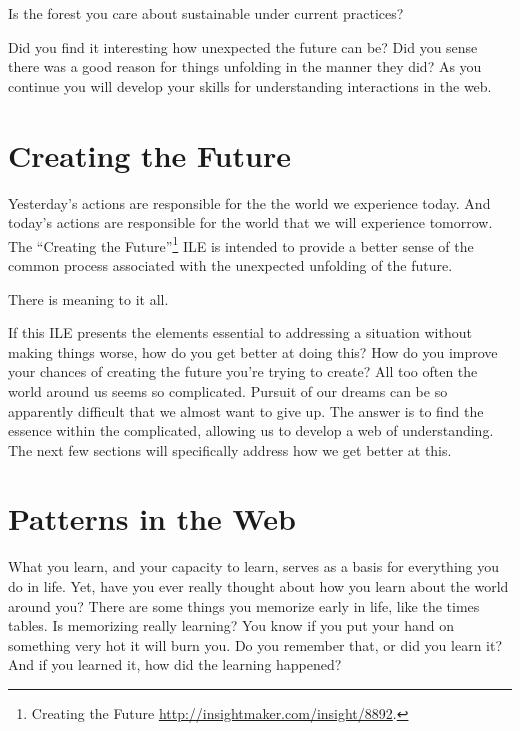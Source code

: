 \documentclass[]{memoir}
\begin{document}
\FloatBarrier 

\begin{model}[frametitle={Model: Sustaining the Forest}] 

 Is the forest you care about sustainable under current practices?




 \end{model}

Did you find it interesting how unexpected the future can be? Did you
sense there was a good reason for things unfolding in the manner they
did? As you continue you will develop your skills for understanding
interactions in the web.

\section{Creating the Future}

Yesterday's actions are responsible for the the world we experience
today. And today's actions are responsible for the world that we will
experience tomorrow. The ``Creating the Future''\footnote{Creating the
  Future \url{http://insightmaker.com/insight/8892}.} ILE is intended to
provide a better sense of the common process associated with the
unexpected unfolding of the future.

\FloatBarrier 

\begin{model}[frametitle={Model: Creating the Future}] 

 There is meaning to it all.




 \end{model}

If this ILE presents the elements essential to addressing a situation
without making things worse, how do you get better at doing this? How do
you improve your chances of creating the future you're trying to create?
All too often the world around us seems so complicated. Pursuit of our
dreams can be so apparently difficult that we almost want to give up.
The answer is to find the essence within the complicated, allowing us to
develop a web of understanding. The next few sections will specifically
address how we get better at this.

\section{Patterns in the Web}

What you learn, and your capacity to learn, serves as a basis for
everything you do in life. Yet, have you ever really thought about how
you learn about the world around you? There are some things you memorize
early in life, like the times tables. Is memorizing really learning? You
know if you put your hand on something very hot it will burn you. Do you
remember that, or did you learn it? And if you learned it, how did the
learning happened?
\end{document}
